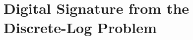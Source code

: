\begin{comment}
\begin{frame}\frametitle{Proof of Security of ``Hash-and-Sign'' Paradigm}
\textbf{Idea}: a forgery must involve either finding a collision in $H$ or forging a signature with respect to $\Pi$.
\begin{proof}
$\mathcal{A}'$ attacks $\Pi'$ and output $(m,\sigma)$, $m\notin \mathcal{Q}$.\\
$\mathsf{SF}$: $\mathsf{Sigforge}_{\mathcal{A}',\Pi'}(n)=1$.\\
$\mathsf{coll}$: $\exists m' \in \mathcal{Q}$, $H^s(m')=H^s(m)$.
\[\Pr[\mathsf{SF}] = \Pr[\mathsf{SF} \land \mathsf{coll}] + \Pr[\mathsf{SF} \land \overline{\mathsf{coll}}] \le \Pr[\mathsf{coll}]+\Pr[\mathsf{SF} \land \overline{\mathsf{coll}}].\]
Reduce $\mathcal{C}$ for $\Pi_H$ to $\mathcal{A}'$. $\Pr[\mathsf{coll}] = \Pr[\mathsf{Hashcoll}_{\mathcal{C},\Pi_H}(n)=1]$. \\
Reduce $\mathcal{A}$ for $\Pi$ to $\mathcal{A}'$.
$\Pr[\mathsf{SF} \land \overline{\mathsf{coll}}] = \Pr[\mathsf{Sigforge}_{\mathcal{A},\Pi}(n)=1]$.\\
So both $\Pr[\mathsf{coll}]$ and $\Pr[\mathsf{SF} \land \overline{\mathsf{coll}}]$ are negligible.
\end{proof}
\end{frame}
\begin{frame}\frametitle{Proof (Cont.)}
Reduce $\mathcal{C}$ for $\Pi_H$ to $\mathcal{A}'$. $\mathcal{A}'$ queries the signature $\sigma_i$ of $i$-th message $m_i$, $i = 1,\dotsc,\abs{\mathcal{Q}}$.
\begin{figure}
\begin{center}

\end{center}
\end{figure}
$\Pr[\mathsf{coll}] = \Pr[\mathsf{Hashcoll}_{\mathcal{C},\Pi_H}(n)=1]$.
\end{frame}
\begin{frame}\frametitle{Proof (Cont.)}
Reduce $\mathcal{A}$ for $\Pi$ to $\mathcal{A}'$.
\begin{figure}
\begin{center}

\end{center}
\end{figure}
$\Pr[\mathsf{SF} \land \overline{\mathsf{coll}}] = \Pr[\mathsf{Sigforge}_{\mathcal{A},\Pi}(n)=1]$.
\end{frame}
\end{comment}

\section{Digital Signature from the Discrete-Log Problem}

